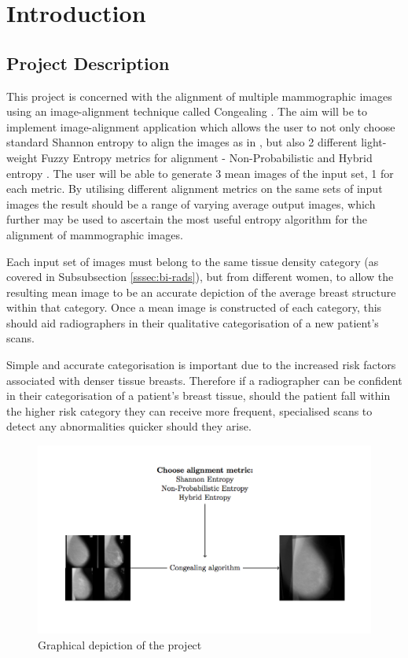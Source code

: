 \chapter{Introduction}

\section{Project Description}
This project is concerned with the alignment of multiple mammographic images using an image-alignment technique called \Gls{Congealing} \cite{joint-alignment}. The aim will be to implement image-alignment application which allows the user to not only choose standard Shannon entropy to align the images as in \cite{joint-alignment}, but also 2 different light-weight Fuzzy Entropy metrics for alignment - Non-Probabilistic \cite{DeLuca_Termini_1972} and Hybrid entropy \cite{Pal_Pal_1992}. The user will be able to generate 3 mean images of the input set, 1 for each metric. By utilising different alignment metrics on the same sets of input images the result should be a range of varying average output images, which further may be used to ascertain the most useful entropy algorithm for the alignment of mammographic images.

Each input set of images must belong to the same tissue density category (as covered in Subsubsection \ref{sssec:bi-rads}), but from different women, to allow the resulting mean image to be an accurate depiction of the average breast structure within that category. Once a mean image is constructed of each category, this should aid radiographers in their qualitative categorisation of a new patient's scans.

Simple and accurate categorisation is important due to the increased risk factors associated with denser tissue breasts. Therefore if a radiographer can be confident in their categorisation of a patient's breast tissue, should the patient fall within the higher risk category they can receive more frequent, specialised scans to detect any abnormalities quicker should they arise.

\begin{figure}[H]
  \center
    \includegraphics{Introduction/diagram/diagram.png}
    \caption{Graphical depiction of the project}
    \label{fig:project-desc-img}
\end{figure}




